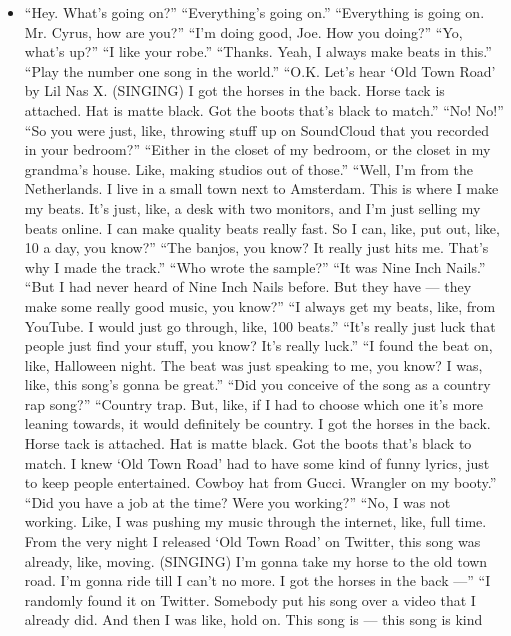 \begin{itemize}
\tightlist
\item
  ``Hey. What's going on?'' ``Everything's going on.'' ``Everything is
  going on. Mr. Cyrus, how are you?'' ``I'm doing good, Joe. How you
  doing?'' ``Yo, what's up?'' ``I like your robe.'' ``Thanks. Yeah, I
  always make beats in this.'' ``Play the number one song in the
  world.'' ``O.K. Let's hear `Old Town Road' by Lil Nas X. (SINGING) I
  got the horses in the back. Horse tack is attached. Hat is matte
  black. Got the boots that's black to match.'' ``No! No!'' ``So you
  were just, like, throwing stuff up on SoundCloud that you recorded in
  your bedroom?'' ``Either in the closet of my bedroom, or the closet in
  my grandma's house. Like, making studios out of those.'' ``Well, I'm
  from the Netherlands. I live in a small town next to Amsterdam. This
  is where I make my beats. It's just, like, a desk with two monitors,
  and I'm just selling my beats online. I can make quality beats really
  fast. So I can, like, put out, like, 10 a day, you know?'' ``The
  banjos, you know? It really just hits me. That's why I made the
  track.'' ``Who wrote the sample?'' ``It was Nine Inch Nails.'' ``But I
  had never heard of Nine Inch Nails before. But they have --- they make
  some really good music, you know?'' ``I always get my beats, like,
  from YouTube. I would just go through, like, 100 beats.'' ``It's
  really just luck that people just find your stuff, you know? It's
  really luck.'' ``I found the beat on, like, Halloween night. The beat
  was just speaking to me, you know? I was, like, this song's gonna be
  great.'' ``Did you conceive of the song as a country rap song?''
  ``Country trap. But, like, if I had to choose which one it's more
  leaning towards, it would definitely be country. I got the horses in
  the back. Horse tack is attached. Hat is matte black. Got the boots
  that's black to match. I knew `Old Town Road' had to have some kind of
  funny lyrics, just to keep people entertained. Cowboy hat from Gucci.
  Wrangler on my booty.'' ``Did you have a job at the time? Were you
  working?'' ``No, I was not working. Like, I was pushing my music
  through the internet, like, full time. From the very night I released
  `Old Town Road' on Twitter, this song was already, like, moving.
  (SINGING) I'm gonna take my horse to the old town road. I'm gonna ride
  till I can't no more. I got the horses in the back ---'' ``I randomly
  found it on Twitter. Somebody put his song over a video that I already
  did. And then I was like, hold on. This song is --- this song is kind

\end{itemize}
